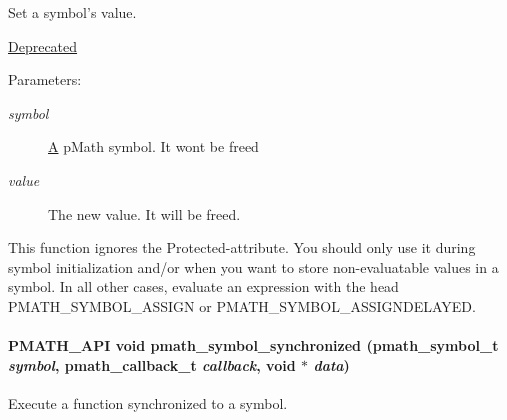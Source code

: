 Set a symbol's value. 

\begin{Desc}
\item[\hyperlink{deprecated__deprecated000002}{Deprecated}]\end{Desc}
\begin{Desc}
\item[Parameters:]
\begin{description}
\item[{\em symbol}]\hyperlink{class_a}{A} pMath symbol. It wont be freed \item[{\em value}]The new value. It will be freed.\end{description}
\end{Desc}
This function ignores the Protected-attribute. You should only use it during symbol initialization and/or when you want to store non-evaluatable values in a symbol. In all other cases, evaluate an expression with the head PMATH\_\-SYMBOL\_\-ASSIGN or PMATH\_\-SYMBOL\_\-ASSIGNDELAYED. \hypertarget{group__symbols_g95b141d9cb33fba80d6a807f304ee3b7}{
\paragraph[{pmath\_\-symbol\_\-synchronized}]{\setlength{\rightskip}{0pt plus 5cm}PMATH\_\-API void pmath\_\-symbol\_\-synchronized ({\bf pmath\_\-symbol\_\-t} {\em symbol}, \/  {\bf pmath\_\-callback\_\-t} {\em callback}, \/  void $\ast$ {\em data})}\hfill}
\label{group__symbols_g95b141d9cb33fba80d6a807f304ee3b7}


Execute a function synchronized to a symbol. 

